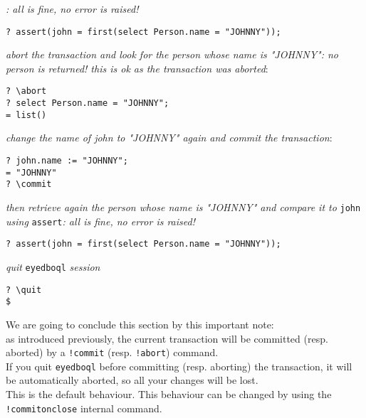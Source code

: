 \emph{: all is fine, no error is raised!}
\begin{verbatim}
? assert(john = first(select Person.name = "JOHNNY"));
\end{verbatim}
\emph{abort the transaction and look for the person whose name is
"JOHNNY": no person is returned! this is ok as the transaction was aborted}:
\begin{verbatim}
? \abort
? select Person.name = "JOHNNY";
= list()
\end{verbatim}
\emph{change the name of john to "JOHNNY" again and commit the transaction}:
\begin{verbatim}
? john.name := "JOHNNY";
= "JOHNNY"
? \commit
\end{verbatim}
\emph{then retrieve again the person whose name is "JOHNNY" and compare
it to} \texttt{john} \emph{using}
\texttt{assert}\emph{: all is fine, no error is raised!}
\begin{verbatim}
? assert(john = first(select Person.name = "JOHNNY"));
\end{verbatim}
\emph{quit} \texttt{eyedboql} \emph{session}
\begin{verbatim}
? \quit
$
\end{verbatim}
We are going to conclude this section by this important note:\\
as introduced previously,
the current transaction will be committed (resp. aborted) by a \texttt{!commit}
(resp. \texttt{!abort}) command.
\\
If you quit \texttt{eyedboql} before committing (resp. aborting) the transaction,
it will be automatically aborted, so all your changes will be lost.
\\
This is the default behaviour. This behaviour can be changed by using the
\texttt{!commitonclose} internal command.

